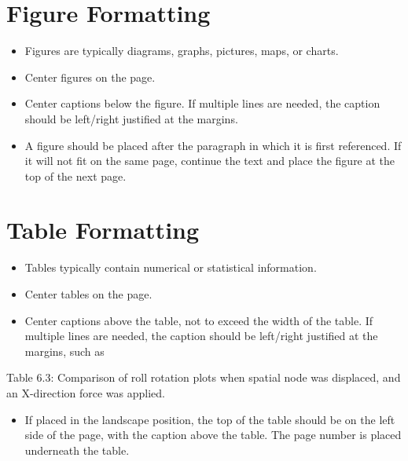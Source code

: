 	\section{Figure Formatting}
	\begin{itemize}
		\item Figures are typically diagrams, graphs, pictures, maps, or charts.
		\item Center figures on the page.
		\item Center captions below the figure. If multiple lines are needed, the caption should be left/right justified at the margins.
		\item A figure should be placed after the paragraph in which it is first referenced. If it will not fit on the same page, continue the text and place the figure at the top of the next page.
	\end{itemize}
	
	\section{Table Formatting}
	\begin{itemize}
		\item Tables typically contain numerical or statistical information.
		\item Center tables on the page.
		\item Center captions above the table, not to exceed the width of the table. If multiple lines are needed, the caption should be left/right justified at the margins, such as
	\end{itemize}
	
	\noindent Table 6.3: Comparison of roll rotation plots when spatial node was displaced, and an X-direction force was applied.
	
	\begin{itemize}
		\item If placed in the landscape position, the top of the table should be on the left side of the page, with the caption above the table. The page number is placed underneath the table.
	\end{itemize}